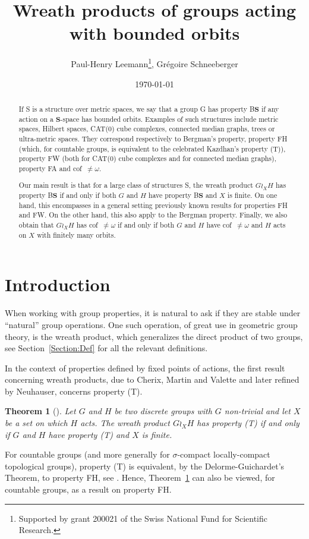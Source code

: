 \documentclass[a4paper]{article}
\title{Wreath products of groups acting with bounded orbits}
\author{Paul-Henry Leemann\thanks{Supported by grant 200021\textunderscore188578 of the Swiss National Fund for Scientific Research.}, Grégoire Schneeberger}
\date{\today \quad \currenttime}
\newtheorem{thm}[lem]{Theorem}
\theoremstyle{definition}
\newcommand*{\BS}{B$\mathbf{S}$}
\begin{document}
\maketitle
%
%
%
%
%
%
%
%
%
%
\begin{abstract}
If S is a structure over metric spaces, we say that a group G has property \BS{} if any action on a $\mathbf S$-space has bounded orbits. Examples of such structures include metric spaces, Hilbert spaces, CAT(0) cube complexes, connected median graphs, trees or ultra-metric spaces.
They correspond respectively to Bergman's property, property FH (which, for countable groups, is equivalent to the celebrated Kazdhan's property (T)), property FW (both for CAT(0) cube complexes and for connected median graphs), property FA and cof~$\neq\omega$.

Our main result is that for a large class of structures S, the wreath product $G\wr_XH$ has property \BS{} if and only if both $G$ and $H$ have property \BS{} and $X$ is finite. On one hand, this encompasses in a general setting previously known results for properties FH and FW. On the other hand, this also apply to the Bergman property.
Finally, we also obtain that $G\wr_XH$ has cof~$\neq\omega$ if and only if both $G$ and $H$ have cof~$\neq\omega$ and $H$ acts on $X$ with finitely many orbits.
\end{abstract}
%
%
%
%
%
%
%
%
%
%
%
%
%
%
%
%
%
%
%
%
%
%
%
%
%
\section{Introduction}
%
%
%
%
%
%
When working with group properties, it is natural to ask if they are stable under ``natural'' group operations. One such operation, of great use in geometric group theory, is the wreath product, which generalizes the direct product of two groups, see Section~\ref{Section:Def} for all the relevant definitions.

In the context of properties defined by fixed points of actions, the first result concerning wreath products, due to Cherix, Martin and Valette and later refined by Neuhauser, concerns property (T).
%
%
\begin{thm}[\cite{Cherix2004,Neuhauser2005a}] \label{T:Wreath_prop_T}
Let $G$ and $H$ be two discrete groups with $G$ non-trivial and let $X$ be a set on which $H$ acts. The wreath product $G \wr_X H$ has property (T) if and only if $G$ and $H$ have property (T) and $X$ is finite.
\end{thm}
%
%
For countable groups (and more generally for $\sigma$-compact locally-compact topological groups), property (T) is equivalent, by the Delorme-Guichardet's Theorem, to property FH, see \cite[Thm. 2.12.4]{Bekka2008}.
Hence, Theorem~\ref{T:Wreath_prop_T} can also be viewed, for countable groups, as a result on property FH.
\end{document}
